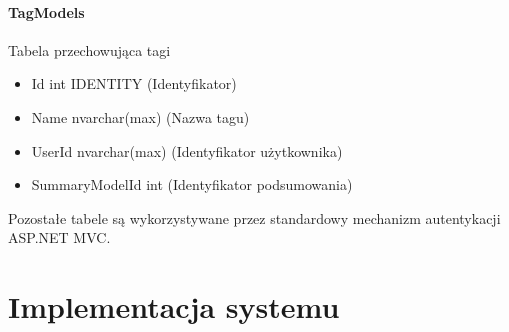 \documentclass[10pt,titlepage]{article}
\begin{document}
\paragraph[short]{TagModels}
Tabela przechowująca tagi
\begin{itemize}
  \item Id int IDENTITY (Identyfikator)
  \item Name nvarchar(max) (Nazwa tagu)
  \item UserId nvarchar(max) (Identyfikator użytkownika)
  \item SummaryModelId int (Identyfikator podsumowania)
\end{itemize}
Pozostałe tabele są wykorzystywane przez standardowy mechanizm autentykacji ASP.NET MVC.
\section{Implementacja systemu}
\end{document}
